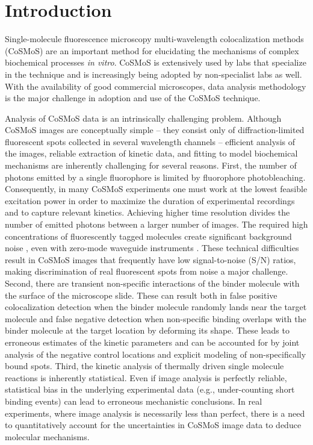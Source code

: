 \section{Introduction}

Single-molecule fluorescence microscopy multi-wavelength colocalization methods (CoSMoS) are an important method for elucidating the mechanisms of complex biochemical processes \textit{in vitro}. CoSMoS is extensively used by labs that specialize in the technique and is increasingly being adopted by non-specialist labs as well. With the availability of good commercial microscopes, data analysis methodology is the major challenge in adoption and use of the CoSMoS technique.

Analysis of CoSMoS data is an intrinsically challenging problem. Although CoSMoS images are conceptually simple -- they consist only of diffraction-limited fluorescent spots collected in several wavelength channels -- efficient analysis of the images, reliable extraction of kinetic data, and fitting to model biochemical mechanisms are inherently challenging for several reasons. First, the number of photons emitted by a single fluorophore is limited by fluorophore photobleaching. Consequently, in many CoSMoS experiments one must work at the lowest feasible excitation power in order to maximize the duration of experimental recordings and to capture relevant kinetics. Achieving higher time resolution divides the number of emitted photons between a larger number of images. The required high concentrations of fluorescently tagged molecules create significant background noise \citep{peng_breaking_nodate, van_oijen_single-molecule_2011}, even with zero-mode waveguide instruments \citep{chen_high-throughput_2014}. These technical difficulties result in CoSMoS images that frequently have low signal-to-noise (S/N) ratios, making discrimination of real fluorescent spots from noise a major challenge. Second, there are transient non-specific interactions of the binder molecule with the surface of the microscope slide. These can result both in false positive colocalization detection when the binder molecule randomly lands near the target molecule and false negative detection when non-specific binding overlaps with the binder molecule at the target location by deforming its shape. These leads to erroneous estimates of the kinetic parameters and can be accounted for by joint analysis of the negative control locations and explicit modeling of non-specifically bound spots. Third, the kinetic analysis of thermally driven single molecule reactions is inherently statistical. Even if image analysis is perfectly reliable, statistical bias in the underlying experimental data (e.g., under-counting short binding events) can lead to erroneous mechanistic conclusions. In real experiments, where image analysis is necessarily less than perfect, there is a need to quantitatively account for the uncertainties in CoSMoS image data to deduce molecular mechanisms.


